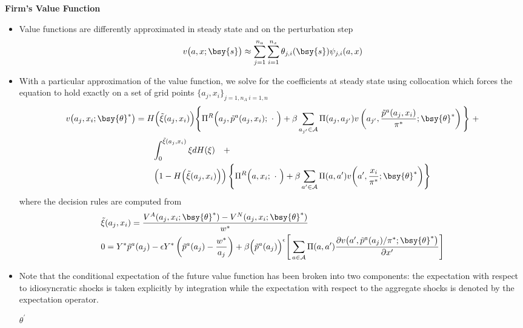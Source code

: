 \documentclass[a4paper,10pt]{article}  %
\begin{document}
\textbf{Firm's Value Function}
\begin{itemize}[label=\raisebox{0.25ex}{\tiny $\bullet$ }]
   
   \item Value functions are differently approximated in steady state and on the perturbation step 
   \begin{equation}
      \label{eq:approx_value_function}
      v\big( a, x; \bsy{s} \big) \approx \sum_{j=1}^{n_a} \sum_{i=1}^{n_x} \theta_{j,i}( \bsy{s} ) \psi_{j,i} (a,x)
   \end{equation}
   \item With a particular approximation of the value function, we solve for the coefficients at steady state 
   using collocation which forces the equation to hold exactly on a set of grid points $ \big\{a_j, x_i \big\}_{j=1,n_A \ i =1,n} $
   \begin{align*}
      v \big( a_j, x_i; \bsy{\theta}^* \big) & = 
      H \Big( \tilde{\xi}(a_j,x_i) \Big) 
         \Bigg\{ 
               \Pi^R\Big( a_j, \tilde{p}^a (a_j, x_i) ; \ \cdot \ \Big) + \beta\sum_{a_{j'}\in \mathcal{A} } \Pi(a_j,a_{j'})
               v \left( a_{j'},\frac{\tilde{p}^a (a_j, x_i)}{\pi^*} ; \bsy{\theta}^* \right) 
         \Bigg\} \  + \\
      & \qquad \int_0^{ \tilde{\xi}(a_j,x_i) } \xi dH(\xi) \quad + \\
      & \qquad \left( 1- H\Big( \tilde{\xi}(a_j,x_i) \Big) \right) 
         \Bigg\{
               \Pi^R\Big( a, x_i ; \ \cdot \ \Big) + \beta\sum_{a'\in \mathcal{A} } \Pi(a,a')
               v \bigg( a',\frac{x_i}{\pi^*} ; \bsy{\theta}^* \bigg) 
         \Bigg\}
   \end{align*}
   where the decision rules are computed from
   \begin{align}
      \label{eq:policies_eq1}
      & \tilde{\xi}(a_j, x_i) = \frac{ V^A(a_j, x_i ; \bsy{\theta}^*) - V^N(a_j, x_i ; \bsy{\theta}^*) }{ w^* } \\
      \label{eq:policies_eq2}
      & 0 = Y^* \tilde{p}^{a}( a_j )  - \epsilon Y^* \left( \tilde{p}^a( a_j ) - \frac{ w^* }{a_j} \right) + 
      \beta \Big( \tilde{p}^a( a_j ) \Big)^{\epsilon} 
      \Bigg[ 
            \sum_{a\in \mathcal{A} } \Pi (a,a') \frac{ \partial v \big( a', \tilde{p}^a( a_j )/\pi^* ; \bsy{\theta}^* \big) }{ \partial x' } 
      \Bigg]
   \end{align}
   \item Note that the conditional expectation of the future value function has been broken into two components:
    the expectation with respect to idiosyncratic shocks is taken explicitly by integration while the expectation 
    with respect to the aggregate shocks is denoted by the expectation operator. 

    $ \theta^\prime $
\end{itemize}
\end{document}
